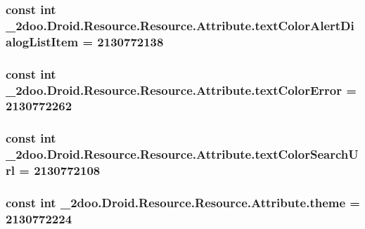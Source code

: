 \hypertarget{class__2doo_1_1_droid_1_1_resource_1_1_attribute_6ed8ed055cc74feca7fb749aed11271d}{
\subsubsection[{textColorAlertDialogListItem}]{\setlength{\rightskip}{0pt plus 5cm}const int \_\-2doo.Droid.Resource.Resource.Attribute.textColorAlertDialogListItem = 2130772138}}
\label{class__2doo_1_1_droid_1_1_resource_1_1_attribute_6ed8ed055cc74feca7fb749aed11271d}


\hypertarget{class__2doo_1_1_droid_1_1_resource_1_1_attribute_09266a22ebc611b3edc1fdf4fd31cf89}{
\subsubsection[{textColorError}]{\setlength{\rightskip}{0pt plus 5cm}const int \_\-2doo.Droid.Resource.Resource.Attribute.textColorError = 2130772262}}
\label{class__2doo_1_1_droid_1_1_resource_1_1_attribute_09266a22ebc611b3edc1fdf4fd31cf89}


\hypertarget{class__2doo_1_1_droid_1_1_resource_1_1_attribute_098c57949e30e705fd2008dfaa7f43f1}{
\subsubsection[{textColorSearchUrl}]{\setlength{\rightskip}{0pt plus 5cm}const int \_\-2doo.Droid.Resource.Resource.Attribute.textColorSearchUrl = 2130772108}}
\label{class__2doo_1_1_droid_1_1_resource_1_1_attribute_098c57949e30e705fd2008dfaa7f43f1}


\hypertarget{class__2doo_1_1_droid_1_1_resource_1_1_attribute_60c10dbe63ccf2da06e13f76723c81ab}{
\subsubsection[{theme}]{\setlength{\rightskip}{0pt plus 5cm}const int \_\-2doo.Droid.Resource.Resource.Attribute.theme = 2130772224}}
\label{class__2doo_1_1_droid_1_1_resource_1_1_attribute_60c10dbe63ccf2da06e13f76723c81ab}


